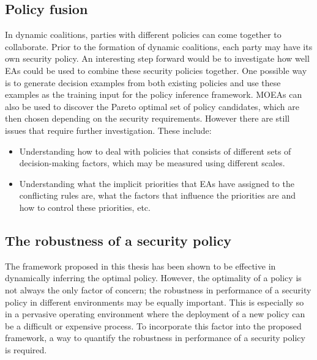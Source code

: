 \subsection{Policy fusion}
In dynamic coalitions, parties with different policies can come
together to collaborate. Prior to the formation of dynamic coalitions,
each party may have its own security policy. An interesting step
forward would be to investigate how well EAs could be used to combine
these security policies together. One possible way is to generate
decision examples from both existing policies and use these examples
as the training input for the policy inference framework. MOEAs can
also be used to discover the Pareto optimal set of policy candidates,
which are then chosen depending on the security requirements. However
there are still issues that require further investigation. These
include:
\begin{itemize}
\item Understanding how to deal with policies that consists of
  different sets of decision-making factors, which may be measured
  using different scales.
\item Understanding what the implicit priorities that EAs have
  assigned to the conflicting rules are, what the factors that
  influence the priorities are and how to control these priorities,
  etc.
\end{itemize}

\subsection{The robustness of a security policy}
The framework proposed in this thesis has been shown to be effective
in dynamically inferring the optimal policy. However, the optimality
of a policy is not always the only factor of concern; the robustness
in performance of a security policy in different environments may be
equally important. This is especially so in a pervasive operating
environment where the deployment of a new policy can be a difficult or
expensive process. To incorporate this factor into the proposed
framework, a way to quantify the robustness in performance of a
security policy is required.


